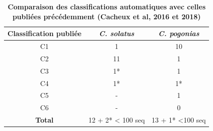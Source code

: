 \documentclass[12pt,a4paper]{article}
\begin{document}
		\begin{table}
			\center
			\begin{tabular}{|c|c|c|}
	    	\hline
			\textbf{Classification publiée} &  \textbf{\textit{C. solatus}}  & \textbf{\textit{C. pogonias}}\\
			\hline
			C1 &  1  & 10\\
			\hline
			C2 & 11  & 1 \\
			\hline
			C3 & 1* & 1 \\
			\hline
			C4 & 1* & 1* \\
			\hline
			C5 & - 	 &  1 \\
			\hline
			C6 & -   &  0 \\
			\hline
			\textbf{Total} & 12 + 2* < 100 seq  &  13 + 1* <100 seq \\
			\hline
		\end{tabular}
		\caption{\textbf{Comparaison des classifications automatiques avec celles publiées précédemment (Cacheux et al, 2016 et 2018)}}
		\label{tab_count_fam}
	\end{table}
		
\end{document}
